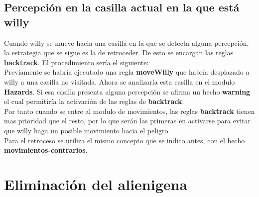 \documentclass[a4paper,10pt]{article}
\begin{document}
\subsection{Percepción en la casilla actual en la que está willy}
Cuando willy se mueve hacia una casilla en la que se detecta alguna percepción, la estrategia que se sigue es la de retroceder. De esto se encargan las reglas {\bf backtrack}. El procedimiento sería el siguiente:
\vspace{0.5 cm}\\
Previamente se habría ejecutado una regla {\bf moveWilly} que habría desplazado a willy a una casilla no visitada. Ahora se analizaría esta casilla en el modulo {\bf Hazards}. Si esa casilla presenta alguna percepción se afirma un hecho {\bf warning} el cual permitiría la activación de las reglas de {\bf backtrack}.
\vspace{0.5 cm}\\
Por tanto cuando se entre al modulo de movimientos, las reglas {\bf backtrack} tienen mas prioridad que el resto, por lo que serán las primeras en activarse para evitar que willy haga un posible movimiento hacia el peligro.
\vspace{0.5 cm}\\
Para el retroceso se utiliza el mismo concepto que se indico antes, con el hecho {\bf movimientos-contrarios}.
\pagebreak



\section{Eliminación del alienigena}
\end{document}
